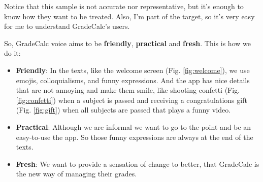 Notice that this sample is not accurate nor representative, but it's enough to know how they want to be treated. Also, I'm part of the target, so it's very easy for me to understand GradeCalc's users.

So, GradeCalc voice aims to be \textbf{friendly}, \textbf{practical} and \textbf{fresh}. This is how we do it:
\begin{itemize}
    \item \textbf{Friendly}: In the texts, like the welcome screen (Fig. \ref{fig:welcome}), we use emojis, colloquialisms, and funny expressions. And the app has nice details that are not annoying and make them smile, like shooting confetti  (Fig. \ref{fig:confetti}) when a subject is passed and receiving a congratulations gift (Fig. \ref{fig:gift}) when all subjects are passed that plays a funny video.
    \item \textbf{Practical}: Although we are informal we want to go to the point and be an easy-to-use the app. So those funny expressions are always at the end of the texts. 
    \item \textbf{Fresh}: We want to provide a sensation of change to better, that GradeCalc is the new way of managing their grades. 
\end{itemize}
